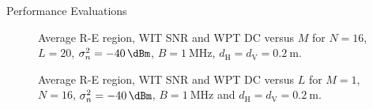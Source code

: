 \documentclass[journal]{IEEEtran}
\begin{document}
\begin{section}{Performance Evaluations}
		\begin{figure}[!t]
			\centering
			\caption{Average R-E region, WIT SNR and WPT DC versus $M$ for $N=16$, $L=20$, $\sigma_n^2=\SI{-40}{\dBm}$, $B=\SI{1}{\MHz}$, $d_{\mathrm{H}}=d_{\mathrm{V}}=\SI{0.2}{\meter}$.}
		\end{figure}

		\begin{figure}[!t]
			\centering
			\caption{Average R-E region, WIT SNR and WPT DC versus $L$ for $M=1$, $N=16$, $\sigma_n^2=\SI{-40}{\dBm}$, $B=\SI{1}{\MHz}$ and $d_{\mathrm{H}}=d_{\mathrm{V}}=\SI{0.2}{\meter}$.}
		\end{figure}


\end{section}
\end{document}
